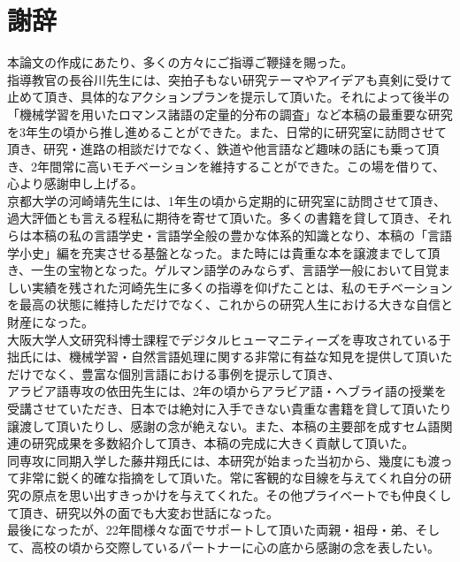 \documentclass[12pt, oneside]{book} %
\begin{document}
\chapter{謝辞}
本論文の作成にあたり、多くの方々にご指導ご鞭撻を賜った。
\\指導教官の長谷川先生には、突拍子もない研究テーマやアイデアも真剣に受けて止めて頂き、具体的なアクションプランを提示して頂いた。それによって後半の「機械学習を用いたロマンス諸語の定量的分布の調査」など本稿の最重要な研究を3年生の頃から推し進めることができた。また、日常的に研究室に訪問させて頂き、研究・進路の相談だけでなく、鉄道や他言語など趣味の話にも乗って頂き、2年間常に高いモチベーションを維持することができた。この場を借りて、心より感謝申し上げる。
\\京都大学の河崎靖先生には、1年生の頃から定期的に研究室に訪問させて頂き、過大評価とも言える程私に期待を寄せて頂いた。多くの書籍を貸して頂き、それらは本稿の私の言語学史・言語学全般の豊かな体系的知識となり、本稿の「言語学小史」編を充実させる基盤となった。また時には貴重な本を譲渡までして頂き、一生の宝物となった。ゲルマン語学のみならず、言語学一般において目覚ましい実績を残された河崎先生に多くの指導を仰げたことは、私のモチベーションを最高の状態に維持しただけでなく、これからの研究人生における大きな自信と財産になった。
\\大阪大学人文研究科博士課程でデジタルヒューマニティーズを専攻されている于拙氏には、機械学習・自然言語処理に関する非常に有益な知見を提供して頂いただけでなく、豊富な個別言語における事例を提示して頂き、
\\アラビア語専攻の依田先生には、2年の頃からアラビア語・ヘブライ語の授業を受講させていただき、日本では絶対に入手できない貴重な書籍を貸して頂いたり譲渡して頂いたりし、感謝の念が絶えない。また、本稿の主要部を成すセム語関連の研究成果を多数紹介して頂き、本稿の完成に大きく貢献して頂いた。
\\同専攻に同期入学した藤井翔氏には、本研究が始まった当初から、幾度にも渡って非常に鋭く的確な指摘をして頂いた。常に客観的な目線を与えてくれ自分の研究の原点を思い出すきっかけを与えてくれた。その他プライベートでも仲良くして頂き、研究以外の面でも大変お世話になった。
\\最後になったが、22年間様々な面でサポートして頂いた両親・祖母・弟、そして、高校の頃から交際しているパートナーに心の底から感謝の念を表したい。
\backmatter

 
\end{document}

